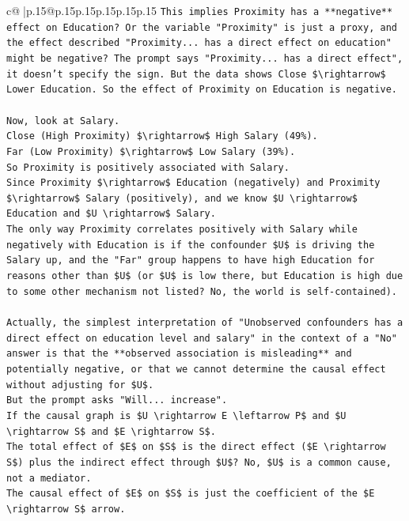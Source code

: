 \documentclass{article}
\begin{document}
{\begin{supertabular}{c@{$\;$}|p{.15\linewidth}@{}p{.15\linewidth}p{.15\linewidth}p{.15\linewidth}p{.15\linewidth}p{.15\linewidth}}
{{{\texttt{This implies Proximity has a **negative** effect on Education? Or the variable "Proximity" is just a proxy, and the effect described "Proximity... has a direct effect on education" might be negative? The prompt says "Proximity... has a direct effect", it doesn't specify the sign. But the data shows Close \$\textbackslash{}rightarrow\$ Lower Education. So the effect of Proximity on Education is negative.} \\
\\ 
\texttt{Now, look at Salary.} \\
\texttt{Close (High Proximity) \$\textbackslash{}rightarrow\$ High Salary (49\%).} \\
\texttt{Far (Low Proximity) \$\textbackslash{}rightarrow\$ Low Salary (39\%).} \\
\texttt{So Proximity is positively associated with Salary.} \\
\texttt{Since Proximity \$\textbackslash{}rightarrow\$ Education (negatively) and Proximity \$\textbackslash{}rightarrow\$ Salary (positively), and we know \$U \textbackslash{}rightarrow\$ Education and \$U \textbackslash{}rightarrow\$ Salary.} \\
\texttt{The only way Proximity correlates positively with Salary while negatively with Education is if the confounder \$U\$ is driving the Salary up, and the "Far" group happens to have high Education for reasons other than \$U\$ (or \$U\$ is low there, but Education is high due to some other mechanism not listed? No, the world is self{-}contained).} \\
\\ 
\texttt{Actually, the simplest interpretation of "Unobserved confounders has a direct effect on education level and salary" in the context of a "No" answer is that the **observed association is misleading** and potentially negative, or that we cannot determine the causal effect without adjusting for \$U\$.} \\
\texttt{But the prompt asks "Will... increase".} \\
\texttt{If the causal graph is \$U \textbackslash{}rightarrow E \textbackslash{}leftarrow P\$ and \$U \textbackslash{}rightarrow S\$ and \$E \textbackslash{}rightarrow S\$.} \\
\texttt{The total effect of \$E\$ on \$S\$ is the direct effect (\$E \textbackslash{}rightarrow S\$) plus the indirect effect through \$U\$? No, \$U\$ is a common cause, not a mediator.} \\
\texttt{The causal effect of \$E\$ on \$S\$ is just the coefficient of the \$E \textbackslash{}rightarrow S\$ arrow.} \\
}}}
\end{supertabular}}
\end{document}
